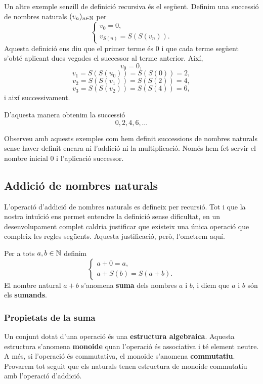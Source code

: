 Un altre exemple senzill de definició recursiva és el següent. Definim una successió de nombres naturals $(v_n)_{n\in\mathbb{N}}$ per
\[
\left\{
\begin{array}{l}
v_0=0,\\
v_{S(n)}=S(S(v_n)).
\end{array}
\right.
\]
Aquesta definició ens diu que el primer terme és $0$ i que cada terme següent s'obté aplicant dues vegades el successor al terme anterior. Així,
\[
v_0=0,
\]
\[
v_1=S(S(u_0))=S(S(0))=2,
\]
\[
v_2=S(S(v_1))=S(S(2))=4,
\]
\[
v_3=S(S(v_2))=S(S(4))=6,
\]
i així successivament.

D'aquesta manera obtenim la successió
\[
0,2,4,6,\ldots
\]

Observeu amb aquests exemples com hem definit successions de nombres naturals sense haver definit encara ni l'addició ni la multiplicació. Només hem fet servir el nombre inicial $0$ i l'aplicació successor.

\subsection{Addició de nombres naturals}

L'operació d'addició de nombres naturals es defineix per recursió. Tot i que la nostra intuïció ens permet entendre la definició sense dificultat, en un desenvolupament complet caldria justificar que existeix una única operació que compleix les regles següents. Aquesta justificació, però, l'ometrem aquí.

\begin{definicio}
Per a tots $a,b\in \mathbb{N}$ definim
\[
\left\{
\begin{array}{l}
a+0=a, \\
a+S(b)=S(a+b).
\end{array}
\right.
\]
El nombre natural $a+b$ s'anomena \textbf{suma} dels nombres $a$ i $b$, i diem que $a$ i $b$ són els \textbf{sumands}.
\end{definicio}

\subsubsection{Propietats de la suma}

Un conjunt dotat d'una operació és una \textbf{estructura algebraica}. Aquesta estructura s'anomena \textbf{monoide} quan l'operació és associativa i té element neutre. A més, si l'operació és commutativa, el monoide s'anomena \textbf{commutatiu}. Provarem tot seguit que els naturals tenen estructura de monoide commutatiu amb l'operació d'addició.


